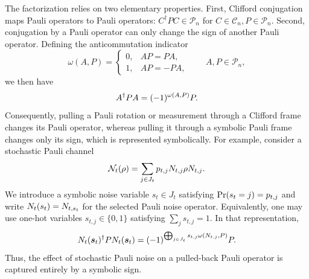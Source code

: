 \documentclass[a4paper,onecolumn,unpublished]{quantumarticle}
\DeclarePairedDelimiter\rbra{\lparen}{\rparen}
\newcommand{\cC}{\mathcal{C}}
\newcommand{\cN}{\mathcal{N}}
\newcommand{\cP}{\mathcal{P}}
\begin{document}
The factorization relies on two elementary properties.
First, Clifford conjugation maps Pauli operators to Pauli operators: $C^\dagger P C \in \cP_n$ for $C \in \cC_n, P \in \cP_n$.
Second, conjugation by a Pauli operator can only change the sign of another Pauli operator.
Defining the anticommutation indicator
\begin{equation*}
    \omega(A,P) =
    \begin{cases}
        0, & AP=PA,\\
        1, & AP=-PA,
    \end{cases}
    \qquad A,P\in\cP_n,
\end{equation*}
we then have
\begin{equation*}
    A^\dagger P A = \rbra{-1}^{\omega(A,P)}P.
\end{equation*}
Consequently, pulling a Pauli rotation or measurement through a Clifford frame changes its Pauli operator, whereas pulling it through a symbolic Pauli frame changes only its sign, which is represented symbolically.
For example, consider a stochastic Pauli channel
\begin{equation*}
    \cN_t\rbra{\rho}
    =
    \sum_{j\in J_t} p_{t,j} N_{t,j}\rho N_{t,j}.
\end{equation*}
We introduce a symbolic noise variable $s_t\in J_t$ satisfying $\Pr\rbra{s_t=j}=p_{t,j}$
and write $N_t\rbra{s_t}=N_{t,s_t}$ for the selected Pauli noise operator.
Equivalently, one may use one-hot variables $s_{t,j}\in\{0,1\}$ satisfying $\sum_j s_{t,j}=1$.
In that representation,
\begin{equation}\label{eq:symbolic-noise-sign}
    N_t\rbra{\bm{s}_t}^{\dagger} P N_t\rbra{\bm{s}_t} =
    \rbra{-1}^{\bigoplus_{j\in J_t} s_{t,j}\omega\rbra{N_{t,j},P}} P.
\end{equation}
Thus, the effect of stochastic Pauli noise on a pulled-back Pauli operator is captured entirely by a symbolic sign.
\end{document}
